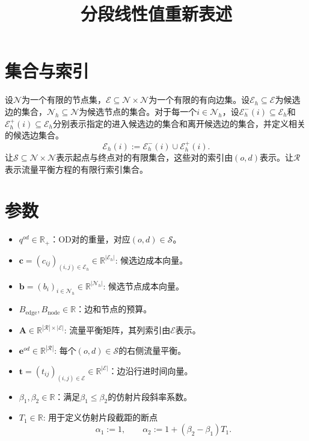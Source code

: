 \documentclass{article}
\title{分段线性值重新表述}
\author{}
\date{}
\begin{document}
\maketitle

\section*{集合与索引}
设\(\mathcal N\)为一个有限的节点集，\(\mathcal E\subseteq\mathcal N\times\mathcal N\)为一个有限的有向边集。设\(\mathcal E_h\subseteq\mathcal E\)为候选边的集合，\(\mathcal N_h\subseteq\mathcal N\)为候选节点的集合。对于每一个\(i\in\mathcal N_h\)，设\(\mathcal E_h^{-}(i)\subseteq\mathcal E_h\)和\(\mathcal E_h^{+}(i)\subseteq\mathcal E_h\)分别表示指定的进入候选边的集合和离开候选边的集合，并定义相关的候选边集合。
\[
\mathcal E_h(i):=\mathcal E_h^{-}(i)\cup\mathcal E_h^{+}(i).
\]
让\(\mathcal S\subseteq\mathcal N\times\mathcal N\)表示起点与终点对的有限集合，这些对的索引由\((o,d)\)表示。让\(\mathcal R\)表示流量平衡方程的有限行索引集合。

\section*{参数}
\begin{itemize}
    \item \(q^{od}\in\mathbb R_+\)：OD对的重量，对应\((o,d)\in\mathcal S\)。
    \item \(\mathbf c=(c_{ij})_{(i,j)\in\mathcal E_h}\in\mathbb R^{|\mathcal E_h|}\): 候选边成本向量。
    \item \(\mathbf b=(b_i)_{i\in\mathcal N_h}\in\mathbb R^{|\mathcal N_h|}\): 候选节点成本向量。
    \item \(B_{\mathrm{edge}},B_{\mathrm{node}}\in\mathbb R\)：边和节点的预算。
    \item \(\mathbf A\in\mathbb R^{|\mathcal R|\times|\mathcal E|}\): 流量平衡矩阵，其列索引由\(\mathcal E\)表示。
    \item \(\mathbf e^{od}\in\mathbb R^{|\mathcal R|}\): 每个\((o,d)\in\mathcal S\)的右侧流量平衡。
    \item \(\mathbf t=(t_{ij})_{(i,j)\in\mathcal E}\in\mathbb R^{|\mathcal E|}\)：边沿行进时间向量。
    \item \(\beta_1,\beta_2\in\mathbb R\)：满足\(\beta_1\leq\beta_2\)的仿射片段斜率系数。
    \item \(T_1\in\mathbb R\): 用于定义仿射片段截距的断点
    \[
    \alpha_1:=1,
    \qquad
    \alpha_2:=1+(\beta_2-\beta_1)T_1.
    \]
\end{itemize}
\end{document}
